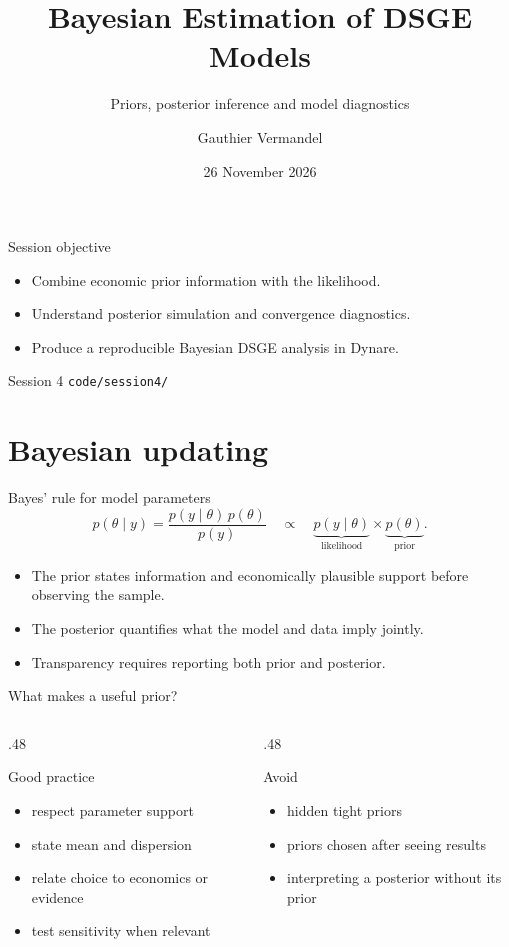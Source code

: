 \documentclass[aspectratio=169,10pt]{beamer}
\title[BTM -- Session 4]{Bayesian Estimation of DSGE Models}
\subtitle{Priors, posterior inference and model diagnostics}
\author[Gauthier Vermandel]{Gauthier Vermandel}
\institute{Paris-Dauphine -- PSL}
\date{26 November 2026}
\begin{document}
\begin{frame}\titlepage\end{frame}
\begin{frame}{Session objective}\begin{itemize}\item Combine economic prior information with the likelihood.\item Understand posterior simulation and convergence diagnostics.\item Produce a reproducible Bayesian DSGE analysis in Dynare.\end{itemize}\vfill{} Session 4 \quad {} \texttt{code/session4/}\end{frame}
\section{Bayesian updating}
\begin{frame}{Bayes' rule for model parameters}
\[p(\theta\mid y)=\frac{p(y\mid\theta)\,p(\theta)}{p(y)}\quad\propto\quad \underbrace{p(y\mid\theta)}_{\text{likelihood}}\times\underbrace{p(\theta)}_{\text{prior}}.\]
\begin{itemize}\item The prior states information and economically plausible support before observing the sample.\item The posterior quantifies what the model and data imply jointly.\item Transparency requires reporting both prior and posterior.\end{itemize}\end{frame}
\begin{frame}{What makes a useful prior?}\begin{columns}[T]\begin{column}{.48\textwidth}\begin{block}{Good practice}\begin{itemize}\item respect parameter support\item state mean and dispersion\item relate choice to economics or evidence\item test sensitivity when relevant\end{itemize}\end{block}\end{column}\begin{column}{.48\textwidth}\begin{block}{Avoid}\begin{itemize}\item hidden tight priors\item priors chosen after seeing results\item interpreting a posterior without its prior\end{itemize}\end{block}\end{column}\end{columns}\end{frame}
\end{document}
